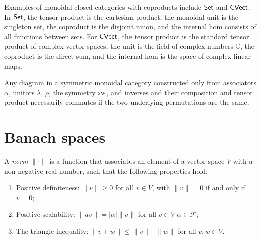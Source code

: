 \begin{example}
Examples of monoidal closed categories with coproducts include $\mathsf{Set}$ and $\mathsf{CVect}$. In $\mathsf{Set}$, the tensor product is the cartesian product, the monoidal unit is the singleton set, the coproduct is the disjoint union, and the internal hom consists of all functions between sets. For $\mathsf{CVect}$, the tensor product is the standard tensor product of complex vector spaces, the unit is the field of complex numbers $\mathbb{C}$, the coproduct is the direct sum, and the internal hom is the space of complex linear maps. %
\end{example}


\begin{theorem} \cite[Section 6.2]{yanofskyMonoidalCategoryTheory2024}
Any diagram in a symmetric monoidal category constructed only from associators $\alpha$, unitors $\lambda$, $\rho$, the symmetry $\mathrm{sw}$, and inverses and their composition and tensor product necessarily commutes if the two underlying permutations are the same.
\end{theorem}





\section{Banach spaces}





\begin{definition} \label{def:norm}
  A \emph{norm} $\|\cdot\|$ is a function that associates an element of a vector space $V$ with a non-negative real number, such that the following properties hold:
  \begin{enumerate}
    \item Positive definiteness: $\|v\| \geq 0$ for all $v \in V$, with $\|v\| = 0$ if and only if $v = 0$;
    \item Positive scalability: $\|av\| = |\alpha|\|v\|$ for all $v \in V$  $\alpha \in \mathcal{F}$;
    \item The triangle inequality: $\|v + w\| \leq \|v\| + \|w\|$ for all $v, w \in V$.
  \end{enumerate}
\end{definition}


